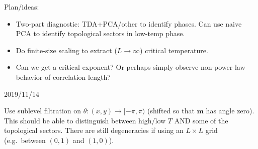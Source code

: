 \documentclass[11pt]{article}
\begin{document}
Plan/ideas:
\begin{itemize}
	\item Two-part diagnostic: TDA+PCA/other to identify phases. Can use naive PCA to identify topological sectors in low-temp phase.
	\item Do finite-size scaling to extract ($L\to\infty$) critical temperature.
	\item Can we get a critical exponent? Or perhaps simply observe non-power law behavior of correlation length?
\end{itemize}


\bigskip\bigskip

2019/11/14

Use sublevel filtration on $\theta:(x,y)\to[-\pi,\pi)$ (shifted so that $\mathbf{m}$ has angle zero). This should be able to distinguish between high/low $T$ AND some of the topological sectors. There are still degeneracies if using an $L\times L$ grid (e.g.~between $(0,1)$ and $(1,0)$).
\end{document}
